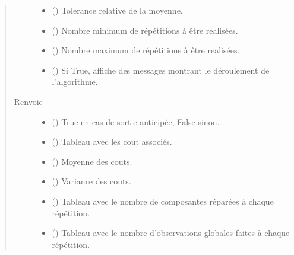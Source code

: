 \documentclass[letterpaper,10pt,french]{sphinxmanual}
\begin{document}
\begin{fulllineitems}
\begin{fulllineitems}
\begin{quote}
\begin{description}
\begin{itemize}
\item {} 
 () \textendash{} Tolerance relative de la moyenne.

\item {} 
 () \textendash{} Nombre minimum de répétitions à être realisées.

\item {} 
 () \textendash{} Nombre maximum de répétitions à être realisées.

\item {} 
 (\sphinxstyleliteralemphasis{\sphinxupquote{, }}) \textendash{} Si True, affiche des messages montrant le déroulement de
l’algorithme.

\end{itemize}

\item[{Renvoie}] \leavevmode
\begin{itemize}
\item {} 
 () \textendash{} True en cas de sortie anticipée, False sinon.

\item {} 
 () \textendash{} Tableau avec les cout associés.

\item {} 
 () \textendash{} Moyenne des couts.

\item {} 
 () \textendash{} Variance des couts.

\item {} 
 () \textendash{} Tableau avec le nombre de composantes réparées à chaque répétition.

\item {} 
 () \textendash{} Tableau avec le nombre d’observations globales faites à chaque
répétition.


\end{itemize}
\end{description}
\end{quote}
\end{fulllineitems}
\end{fulllineitems}
\end{document}
